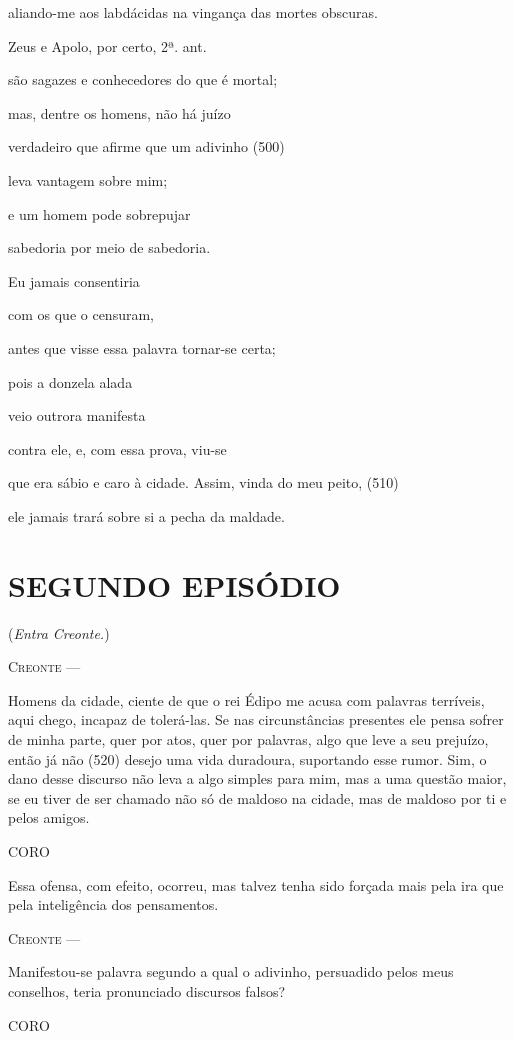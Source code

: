 aliando-me aos labdácidas na vingança das mortes obscuras.

Zeus e Apolo, por certo, 2ª. ant.

são sagazes e conhecedores do que é mortal;

mas, dentre os homens, não há juízo

verdadeiro que afirme que um adivinho (500)

leva vantagem sobre mim;

e um homem pode sobrepujar

sabedoria por meio de sabedoria.

Eu jamais consentiria

com os que o censuram,

antes que visse essa palavra tornar-se certa;

pois a donzela alada

veio outrora manifesta

contra ele, e, com essa prova, viu-se

que era sábio e caro à cidade. Assim, vinda do meu peito, (510)

ele jamais trará sobre si a pecha da maldade.

\section{SEGUNDO EPISÓDIO}

(\emph{Entra Creonte.})

\textsc{Creonte} ---

Homens da cidade, ciente de que o rei Édipo me acusa com palavras
terríveis, aqui chego, incapaz de tolerá-las. Se nas circunstâncias
presentes ele pensa sofrer de minha parte, quer por atos, quer por
palavras, algo que leve a seu prejuízo, então já não (520) desejo uma
vida duradoura, suportando esse rumor. Sim, o dano desse discurso não
leva a algo simples para mim, mas a uma questão maior, se eu tiver de
ser chamado não só de maldoso na cidade, mas de maldoso por ti e pelos
amigos.

\textsc{CORO}

Essa ofensa, com efeito, ocorreu, mas talvez tenha sido forçada mais
pela ira que pela inteligência dos pensamentos.

\textsc{Creonte} ---

Manifestou-se palavra segundo a qual o adivinho, persuadido pelos meus
conselhos, teria pronunciado discursos falsos?

\textsc{CORO}

